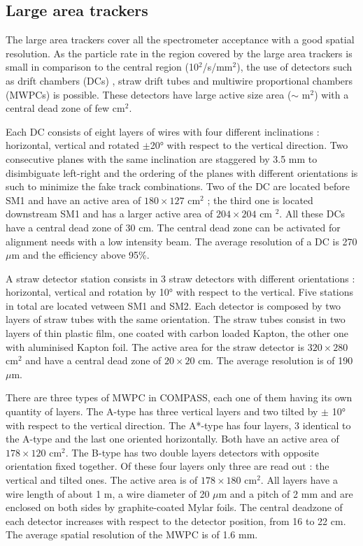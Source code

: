 \subsection*{Large area trackers}

The large area trackers cover all the spectrometer acceptance with a good spatial resolution. As the particle rate in the region
covered by the large area trackers is small in comparison to the central region (10$^2$/s/mm$^2$), the use of detectors such as
drift chambers (DCs) \cite{}, straw drift tubes \cite{} and multiwire proportional chambers (MWPCs) is possible. These detectors
have large active size area ($\sim$ m$^2$) with a central dead zone of few cm$^2$.

Each DC consists of eight layers of wires with four different inclinations : horizontal, vertical and rotated $\pm$20° with respect
to the vertical direction. Two consecutive planes with the same inclination are staggered by 3.5 mm to disimbiguate left-right and
the ordering of the planes with different orientations is such to minimize the fake track combinations. Two of the DC are located before
SM1 and have an active area of $180 \times 127$ cm$^2$ ; the third one is located downstream SM1 and has a larger active area of $204 \times 204$ cm $^2$.
All these DCs have a central dead zone of 30 cm. The central dead zone can be activated for alignment needs with a low intensity beam.
The average resolution of a DC is 270 $\mu$m and the efficiency above 95\%.

A straw detector station consists in 3 straw detectors with different orientations : horizontal, vertical and rotation by 10° with respect
to the vertical. Five stations in total are located vetween SM1 and SM2. Each detector is composed by two layers of straw tubes with the
same orientation. The straw tubes consist in two layers of thin plastic film, one coated with carbon loaded Kapton, the other one with
aluminised Kapton foil. The active area for the straw detector is $320 \times 280$ cm$^2$ and have a central dead zone of $20 \times 20$ cm.
The average resolution is of 190 $\mu$m.

There are three types of MWPC in COMPASS, each one of them having its own quantity of layers. The A-type has three vertical layers and two tilted
by $\pm$ 10° with respect to the vertical direction. The A*-type has four layers, 3 identical to the A-type and the last one oriented horizontally.
Both have an active area of $178 \times 120$ cm$^2$. The B-type has two double layers detectors with opposite orientation fixed together. Of these
four layers only three are read out : the vertical and tilted ones. The active area is of $178 \times 180$ cm$^2$. All layers have a wire length of
about 1 m, a wire diameter of 20 $\mu$m and a pitch of 2 mm and are enclosed on both sides by graphite-coated Mylar foils. The central deadzone of each
detector increases with respect to the detector position, from 16 to 22 cm. The average spatial resolution of the MWPC is of 1.6 mm.

